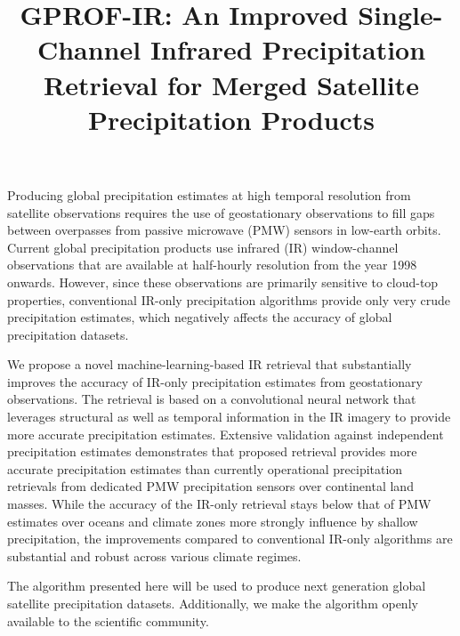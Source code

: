 \documentclass{ametsocV6.1}
\title{GPROF-IR: An Improved Single-Channel Infrared Precipitation Retrieval for Merged Satellite Precipitation Products}
\affiliation{
  \aff{a}{Colorado State University, Fort Collins, USA}\\
  \aff{b}{University of Maryland, Baltimore County, Baltimore, Maryland, USA} \\
  \aff{c}{NASA Goddard Space Flight Center, Greenbelt, Maryland}
}
\begin{document}
\maketitle

%
%
%
\statement

Producing global precipitation estimates at high temporal resolution from
satellite observations requires the use of geostationary observations
 to fill gaps between overpasses from passive microwave (PMW) sensors in low-earth
orbits. Current global precipitation products use infrared (IR) window-channel
observations that are available at half-hourly resolution from the year 1998
onwards. However, since these observations are primarily sensitive to cloud-top
properties, conventional IR-only precipitation algorithms provide only very
crude precipitation estimates, which negatively affects the accuracy of global
precipitation datasets.

We propose a novel machine-learning-based IR retrieval that substantially
improves the accuracy of IR-only precipitation estimates from geostationary
observations. The retrieval is based on a convolutional neural network that
leverages structural as well as temporal information in the IR imagery to
provide more accurate precipitation estimates. Extensive validation against
independent precipitation estimates demonstrates that proposed retrieval
provides more accurate precipitation estimates than currently operational
precipitation retrievals from dedicated PMW precipitation sensors over
continental land masses. While the accuracy of the IR-only retrieval stays below
that of PMW estimates over oceans and climate zones more strongly influence by
shallow precipitation, the improvements compared to conventional IR-only
algorithms are substantial and robust across various climate regimes.

The algorithm presented here will be used to produce next generation global
satellite precipitation datasets. Additionally, we make the algorithm openly
available to the scientific community.
\end{document}
